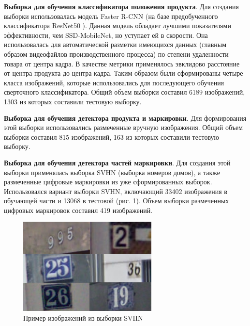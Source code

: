 \textbf{Выборка для обучения классификатора положения продукта}. Для создания выборки использовалась модель Faster R-CNN \cite{ren} (на базе  предобученного классификатора ResNet50 \cite{he}). Данная модель обладает лучшими показателями эффективности, чем SSD-MobileNet, но уступает ей в скорости. Она использовалась для автоматической разметки имеющихся данных (главным образом видеофайлов производственного процесса) по степени удаленности товара от центра кадра. В качестве метрики применялось эвклидово расстояние от центра продукта до центра кадра. Таким образом были сформированы четыре класса изображений, которые использовались для последующего обучения сверточного классификатора. Общий объем выборки составил 6189 изображений, 1303 из которых составили тестовую выборку.

\textbf{Выборка для обучения детектора продукта и маркировки}. Для формирования этой выборки использовались размеченные вручную изображения. Общий объем выборки составил 815 изображений, 163 из которых составили тестовую выборку.


\textbf{Выборка для обучения детектора частей маркировки}. Для создания этой выборки применялась выборка SVHN \cite{netzer} (выборка номеров домов), а также размеченные цифровые маркировки из уже сформированных выборок. Использовался вариант выборки SVHN, включающий 33402 изображения в обучающей части и 13068 в тестовой (рис. \ref{fig:svhn_dataset}). Объем выборки размеченных цифровых маркировок составил 419 изображений.

\begin{figure}[ht]
	\centering
	\includegraphics[width=7cm]{man-source/images/ch4/pic4-14.png}
	\caption{Пример изображений из выборки SVHN}
	\label{fig:svhn_dataset}
\end{figure}

